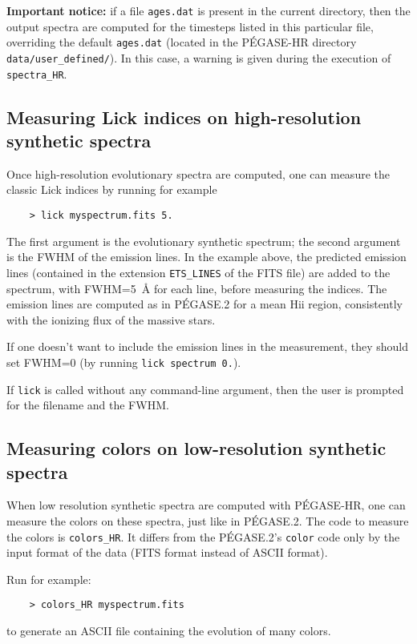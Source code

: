 \documentclass[11pt,fleqn]{article}
\begin{document}
{\bf Important notice:} if a file \texttt{ages.dat} is present in the current
directory, then the output spectra are computed for the timesteps
listed in this particular file, overriding the default \texttt{ages.dat} (located in the
P\'EGASE-HR directory \texttt{data/user\_defined/}). In this case, a warning is given
during the execution of \texttt{spectra\_HR}.

\subsection{Measuring Lick indices on high-resolution synthetic spectra}
\label{lick.sec}
Once high-resolution evolutionary spectra are computed, one can measure
the classic Lick indices by running for example
\begin{verbatim}
    > lick myspectrum.fits 5.
\end{verbatim}
The first argument is the evolutionary synthetic spectrum; the second
argument is the FWHM of the emission lines.  In the example above, the
predicted emission lines (contained in the extension
\texttt{ETS\_LINES} of the FITS file) are added to the spectrum, with
FWHM=5~\AA{} for each line, before measuring the indices. The emission
lines are computed as in P\'EGASE.2 for a mean H{\sc ii} region,
consistently with the ionizing flux of the massive stars.

If one doesn't want to include the emission lines in the measurement, they should set FWHM=0
(by running \texttt{lick spectrum 0.}).

If \texttt{lick} is called without any command-line argument, then the user
is prompted for the filename and the FWHM.

\subsection{Measuring colors on low-resolution synthetic spectra}
When low resolution synthetic spectra are computed with P\'EGASE-HR, one
can measure the colors on these spectra, just like in P\'EGASE.2. 
The code to measure the colors is \texttt{colors\_HR}. It differs from
the P\'EGASE.2's \texttt{color} code only by the input format of the
data (FITS format instead of ASCII format).

Run for example:
\begin{verbatim}
    > colors_HR myspectrum.fits
\end{verbatim}
to generate an ASCII file containing the evolution of many colors.
\end{document}
